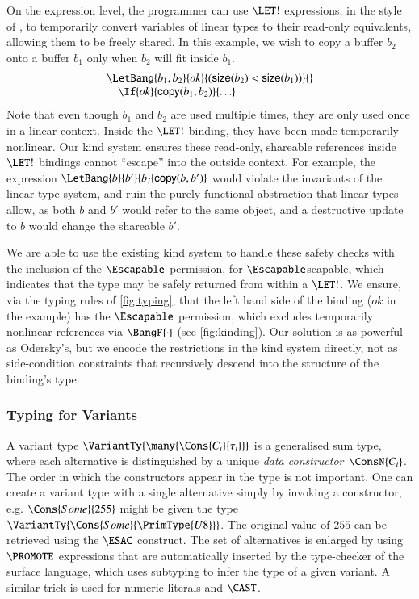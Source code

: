 \documentclass[9pt\ifFinal\else,preprint,nocopyrightspace\fi,\ifAlpha\else natbib,authoryear\fi]{sigplanconf}
\begin{document}
On the expression level, the programmer can use $\LET!$ expressions, in the style of \citet{Wadler_90}, to temporarily convert variables of linear types to their
read-only equivalents, allowing them to be freely shared. In this example, we wish to copy a buffer $b_2$ onto a buffer $b_1$ only when $b_2$ will fit inside
$b_1$. 
$$\begin{array}{l}
  \LetBang{ b_1, b_2 }{\mathit{ok}}{(\mathsf{size}(b_2) < \mathsf{size}(b_1))}{ } \\
  \quad\If{\mathit{ok}}{\mathsf{copy}(b_1, b_2)}{\ldots}
  \end{array}$$ 
Note that even though $b_1$ and $b_2$ are used multiple times, they are only used once in a linear context. Inside the $\LET!$ binding, they have been made
temporarily nonlinear. Our kind system ensures these read-only, shareable references inside $\LET!$ bindings cannot ``escape'' into
the outside context. For example, the expression $\LetBang{b}{b'}{b}{\mathsf{copy}(b, b')}$ would violate the invariants of the linear type system, and ruin the purely
functional abstraction that linear types allow, as both $b$ and $b'$ would refer to the same object, and a destructive update to $b$ would change the shareable $b'$. 

We are able to use the existing kind system to handle these safety checks with
the inclusion of the $\Escapable$ permission, for
$\Escapable$scapable, which indicates that the type may be safely returned
from within a $\LET!$. We ensure, via the typing rules of
\autoref{fig:typing}, that the left hand side of the binding ($\mathit{ok}$ in the example) has the
$\Escapable$ permission, which excludes temporarily nonlinear references via
$\BangF{\cdot}$ (see \autoref{fig:kinding}). Our solution is as powerful as
Odersky's, but we encode the restrictions in the kind system directly, not as 
side-condition constraints that recursively descend into the structure of
the binding's type.




\subsubsection{Typing for Variants}\label{s:variants}
A variant type $\VariantTy{\many{\Cons{C_i}{\tau_i}}}$ is a generalised sum type, where each alternative is distinguished by a unique \emph{data constructor}~$\ConsN{C_i}$. The order in which the constructors appear in the type is not important.
One can create a variant type with a single alternative simply by invoking a constructor, e.g. $\Cons{Some}{255}$ might be given the type
$\VariantTy{\Cons{Some}{\PrimType{U8}}}$. The original value of $255$ can be retrieved using the $\ESAC$ construct. The set of alternatives is enlarged 
by using $\PROMOTE$ expressions that are automatically inserted by the type-checker of the surface language, which uses subtyping to infer the type of a given
variant. A similar trick is used for numeric literals and $\CAST$. 
\end{document}
